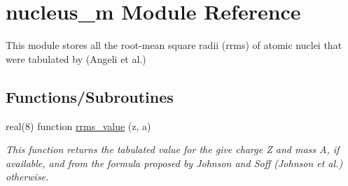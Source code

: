 \hypertarget{namespacenucleus__m}{}\section{nucleus\+\_\+m Module Reference}
\label{namespacenucleus__m}


This module stores all the root-\/mean square radii (rrms) of atomic nuclei that were tabulated by (Angeli et al.)  


\subsection*{Functions/\+Subroutines}
\begin{DoxyCompactItemize}
\item 
real(8) function \mbox{\hyperlink{namespacenucleus__m_a83e8714be10756711874d134c66bcf73}{rrms\+\_\+value}} (z, a)
\begin{DoxyCompactList}\small\item\em This function returns the tabulated value for the give charge Z and mass A, if available, and from the formula proposed by Johnson and Soff (Johnson et al.) otherwise. \end{DoxyCompactList}\end{DoxyCompactItemize}
